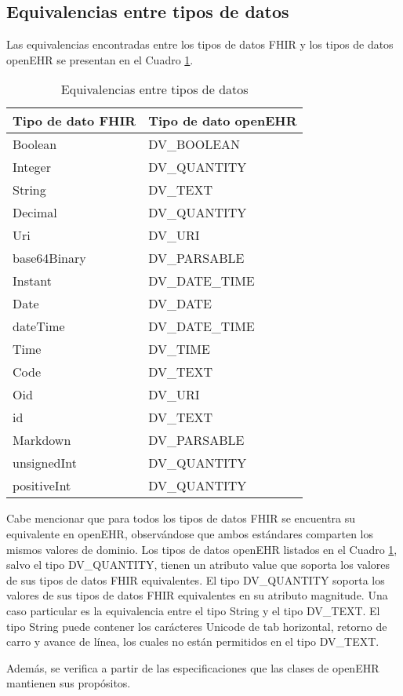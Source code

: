 \subsection{Equivalencias entre tipos de datos}

Las equivalencias encontradas entre los tipos de datos FHIR y los tipos de datos openEHR se presentan en el Cuadro \ref{table:equivalents}.

\begin{table}[h]
  \caption{Equivalencias entre tipos de datos}
  \label{table:equivalents}
  \begin{tabular}{l l}
    \hline
    Tipo de dato FHIR &	Tipo de dato openEHR \\
    \hline
    Boolean	& DV\_BOOLEAN \\
    Integer	& DV\_QUANTITY \\
    String	& DV\_TEXT \\
    Decimal	& DV\_QUANTITY \\
    Uri	& DV\_URI \\
    base64Binary	& DV\_PARSABLE \\
    Instant	& DV\_DATE\_TIME \\
    Date	& DV\_DATE \\
    dateTime	& DV\_DATE\_TIME \\
    Time	& DV\_TIME \\
    Code	& DV\_TEXT \\
    Oid	& DV\_URI \\
    id 	& DV\_TEXT \\
    Markdown	& DV\_PARSABLE \\
    unsignedInt	& DV\_QUANTITY \\
    positiveInt	& DV\_QUANTITY \\
    \hline
  \end{tabular}
\end{table}

Cabe mencionar que para todos los tipos de datos FHIR se encuentra su equivalente en openEHR, observándose que ambos estándares comparten los mismos valores de dominio. Los tipos de datos openEHR listados en el Cuadro \ref{table:equivalents}, salvo el tipo DV\_QUANTITY, tienen un atributo value que soporta los valores de sus tipos de datos FHIR equivalentes. El tipo DV\_QUANTITY soporta los valores de sus tipos de datos FHIR equivalentes en su atributo magnitude. Una caso particular es la equivalencia entre el tipo String y el tipo DV\_TEXT. El tipo String puede contener los carácteres Unicode  de tab horizontal, retorno de carro y avance de línea, los cuales no están permitidos en el tipo DV\_TEXT.

Además, se verifica a partir de las especificaciones que las clases de openEHR mantienen sus propósitos.
